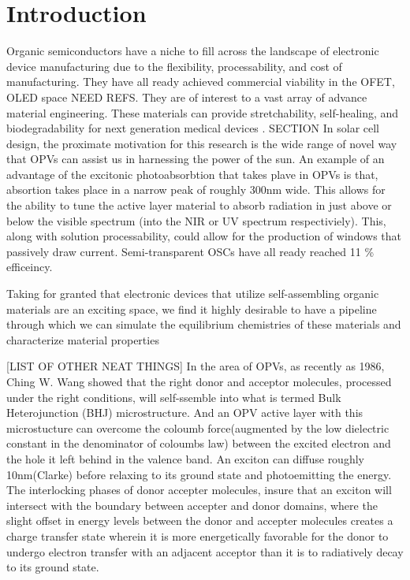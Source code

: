 \chapter{Introduction} 
Organic semiconductors have a niche to fill across the landscape of electronic
device manufacturing due to the flexibility, processability, and cost of manufacturing. They have all ready
achieved commercial viability in the OFET, OLED space NEED REFS. They are of interest to a vast array of
advance material engineering. These materials can
provide stretchability, self-healing, and biodegradability for next generation medical devices
\cite{Brutting2006}.
SECTION
In solar cell design, the proximate motivation for this research is the wide range of novel way that OPVs
can assist us in harnessing the power of the sun. 
An example of an advantage of the excitonic photoabsorbtion that takes plave in OPVs is that, absortion takes place in a narrow peak of roughly 300nm
wide.
This allows for the ability to tune the active layer material to absorb radiation in just above or below the
visible spectrum (into the NIR or UV spectrum respectiviely). This, along with solution processability, 
could allow for the production of windows that passively draw current. Semi-transparent OSCs have all ready
reached 11 \% efficeincy. \cite{Brabec2020}

Taking for granted that electronic devices that utilize self-assembling organic materials are an exciting
space, we find it highly desirable to have a pipeline through which we can simulate the equilibrium
chemistries of these materials and characterize material properties 

[LIST OF OTHER NEAT THINGS] In the area of OPVs, as recently as 1986, Ching W. Wang
showed that the right donor and acceptor molecules, processed under the right conditions, will self-ssemble
into what is termed Bulk Heterojunction (BHJ) microstructure. And an OPV active layer with this microstucture
can overcome the
coloumb force(augmented by the low dielectric constant in the denominator of coloumbs law) between the excited
electron and the hole it left behind in the valence band. An exciton can diffuse roughly 10nm(Clarke) before relaxing
to its ground state and photoemitting the energy. The interlocking phases of donor accepter molecules, insure
that an exciton will intersect with the boundary between accepter and donor domains, where the slight offset in
energy levels between the donor and accepter molecules creates a charge transfer state wherein it is more
energetically favorable for the donor to undergo electron transfer with an adjacent acceptor than it is to radiatively decay to its ground state.

